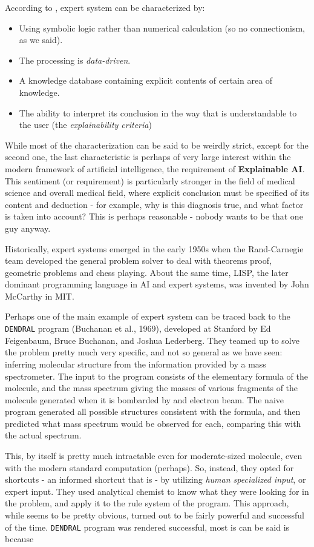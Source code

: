 According to \cite{articleMetaxiotis}, expert system can be characterized by: 
\begin{itemize}
    \item Using symbolic logic rather than numerical calculation (so no connectionism, as we said). 
    \item The processing is \textit{data-driven}. 
    \item A knowledge database containing explicit contents of certain area of knowledge. 
    \item The ability to interpret its conclusion in the way that is understandable to the user (the \textit{explainability criteria})
\end{itemize}
While most of the characterization can be said to be weirdly strict, except for the second one, the last characteristic is perhaps of very large interest within the modern framework of artificial intelligence, the requirement of \textbf{Explainable AI}. This sentiment (or requirement) is particularly stronger in the field of medical science and overall medical field, where explicit conclusion must be specified of its content and deduction - for example, why is this diagnosis true, and what factor is taken into account? This is perhaps reasonable - nobody wants to be that one guy anyway. 

Historically, expert systems emerged in the early 1950s when the Rand-Carnegie team developed the general problem solver to deal with theorems proof, geometric problems and chess playing. About the same time, LISP, the later dominant programming language in AI and expert systems, was invented by John McCarthy in MIT. 

Perhaps one of the main example of expert system can be traced back to the \texttt{DENDRAL} program (Buchanan et al., 1969), developed at Stanford by Ed Feigenbaum, Bruce Buchanan, and Joshua Lederberg. They teamed up to solve the problem pretty much very specific, and not so general as we have seen: inferring molecular structure from the information provided by a mass spectrometer. The input to the program consists of the elementary formula of the molecule, and the mass spectrum giving the masses of various fragments of the molecule generated when it is bombarded by and electron beam. The naive program generated all possible structures consistent with the formula, and then predicted what mass spectrum would be observed for each, comparing this with the actual spectrum. 

This, by itself is pretty much intractable even for moderate-sized molecule, even with the modern standard computation (perhaps). So, instead, they opted for shortcuts - an informed shortcut that is - by utilizing \textit{human specialized input}, or expert input. They used analytical chemist to know what they were looking for in the problem, and apply it to the rule system of the program. This approach, while seems to be pretty obvious, turned out to be fairly powerful and successful of the time. \texttt{DENDRAL} program was rendered successful, most is can be said is because

